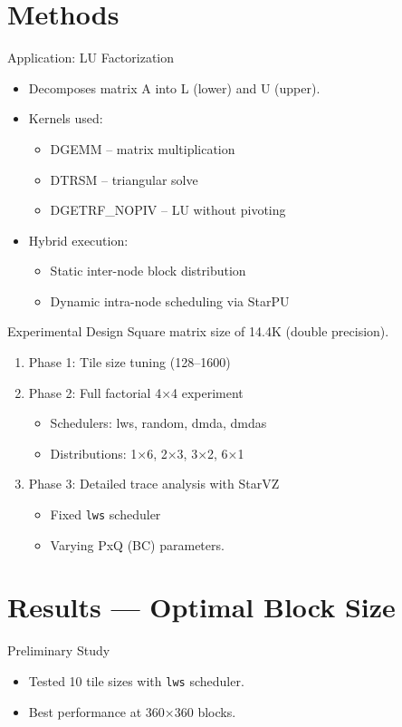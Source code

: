\documentclass[12pt,xcolor=dvipsnames,presentation,aspectratio=169]{beamer}
\begin{document}
{\section{Methods}
\label{sec:orgc1fc23b}
\begin{frame}[label={sec:org9e38ac0}]{Application: LU Factorization}
\begin{itemize}
\item Decomposes matrix A into L (lower) and U (upper).
\item Kernels used:
\begin{itemize}
\item DGEMM – matrix multiplication
\item DTRSM – triangular solve
\item DGETRF\_NOPIV – LU without pivoting
\end{itemize}
\item Hybrid execution:
\begin{itemize}
\item Static inter-node block distribution
\item Dynamic intra-node scheduling via StarPU
\end{itemize}
\end{itemize}
\end{frame}
\begin{frame}[label={sec:org16bcab8},fragile]{Experimental Design}
 Square matrix size of 14.4K (double precision).
\begin{enumerate}
\item \alert{Phase 1}: Tile size tuning (128–1600)
\item \alert{Phase 2}: Full factorial 4×4 experiment
\begin{itemize}
\item Schedulers: lws, random, dmda, dmdas
\item Distributions: 1×6, 2×3, 3×2, 6×1
\end{itemize}
\item \alert{Phase 3}: Detailed trace analysis with StarVZ
\begin{itemize}
\item Fixed \texttt{lws} scheduler
\item Varying PxQ (BC) parameters.
\end{itemize}
\end{enumerate}
\end{frame}
\section{Results — Optimal Block Size}
\label{sec:org19ab87a}
\begin{frame}[label={sec:org652d67c},fragile]{Preliminary Study}
 \begin{itemize}
\item Tested 10 tile sizes with \texttt{lws} scheduler.
\item Best performance at \alert{360×360} blocks.
\end{itemize}


\end{frame}}
\end{document}
